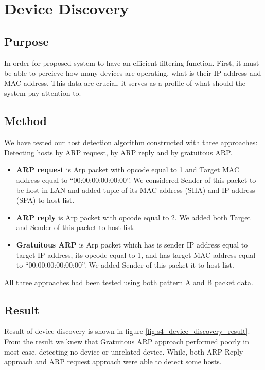 \section{Device Discovery}
\subsection{Purpose}
In order for proposed system to have an efficient filtering function. First,
it must be able to percieve how many devices are operating, what is their IP address and MAC address.
This data are crucial, it serves as a profile of what should the system pay attention to.  

\subsection{Method}
We have tested our host detection algorithm constructed with three approaches: Detecting hosts by ARP request, by ARP reply and by gratuitous ARP.
\begin{itemize}
    \item \textbf{ARP request} is Arp packet with opcode equal to 1 and Target MAC address equal to “00:00:00:00:00:00”. We considered Sender of this packet to be host in LAN and added tuple of its MAC address (SHA) and IP address (SPA) to host list.
    \item \textbf{ARP reply} is Arp packet with opcode equal to 2. We added both Target and Sender of this packet to host list. 
    \item \textbf{Gratuitous ARP} is Arp packet which has is sender IP address equal to target IP address, its opcode equal to 1, and has target MAC address equal to “00:00:00:00:00:00”. We added Sender of this packet it to host list.  
\end{itemize}

All three approaches had been tested using both pattern A and B packet data. 

\subsection{Result}
Result of device discovery is shown in figure \ref{fig:s4_device_discovery_result}. From the result we knew that Gratuitous ARP approach performed poorly in most case, detecting no device or unrelated device. While, both ARP Reply approach and ARP request approach were able to detect some hosts.

